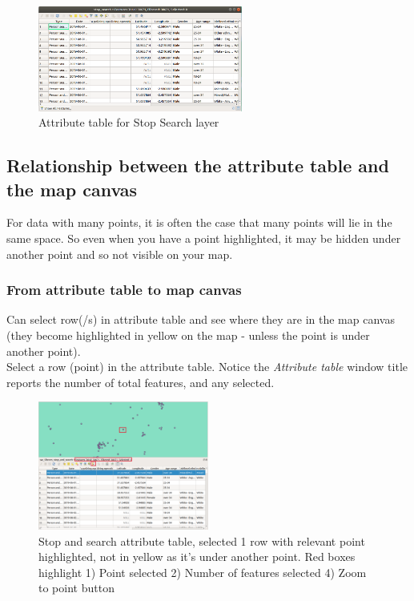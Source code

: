 \begin{figure}[!h]
	\centering
	\includegraphics[width=0.6\textwidth]{images/stop_search_attribute_table.png}
	\caption{Attribute table for Stop Search layer}
	\label{ft_fig_firstfig3}
\end{figure}

\null\newpage

\subsection{Relationship between the attribute table and the map canvas}
For data with many points, it is often the case that many points will lie in the same space. So even when you have a point highlighted, it may be hidden under another point and so not visible on your map.

\subsubsection{From attribute table to map canvas}
Can select row(/s) in attribute table and see where they are in the map canvas (they become highlighted in yellow on the map - unless the point is under another point).\\

Select a row (point) in the attribute table. Notice the \textit{Attribute table} window title reports the number of total features, and any selected.\\

\begin{figure}[!h]
	\centering
	\includegraphics[width=0.5\textwidth]{images/stop_search_one_row_selected_redbox.png}%
	\caption{Stop and search attribute table, selected 1 row with relevant point highlighted, not in yellow as it's under another point. Red boxes highlight 1) Point selected 2) Number of features selected 4) Zoom to point button}
	\label{ft_fig_firstfig3}
\end{figure}

